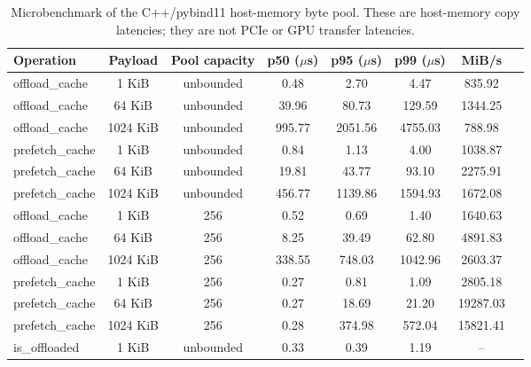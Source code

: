\begin{table}[t]
\centering
\scriptsize
\setlength{\tabcolsep}{2.5pt}
\caption{Microbenchmark of the C++/pybind11 host-memory byte pool. These are host-memory copy latencies; they are not PCIe or GPU transfer latencies.}
\label{tab:pool}
\begin{tabular}{lccccccc}
\toprule
Operation & Payload & Pool capacity & p50 ($\mu$s) & p95 ($\mu$s) & p99 ($\mu$s) & MiB/s \\
\midrule
offload\_cache & 1 KiB & unbounded & 0.48 & 2.70 & 4.47 & 835.92 \\
offload\_cache & 64 KiB & unbounded & 39.96 & 80.73 & 129.59 & 1344.25 \\
offload\_cache & 1024 KiB & unbounded & 995.77 & 2051.56 & 4755.03 & 788.98 \\
prefetch\_cache & 1 KiB & unbounded & 0.84 & 1.13 & 4.00 & 1038.87 \\
prefetch\_cache & 64 KiB & unbounded & 19.81 & 43.77 & 93.10 & 2275.91 \\
prefetch\_cache & 1024 KiB & unbounded & 456.77 & 1139.86 & 1594.93 & 1672.08 \\
offload\_cache & 1 KiB & 256 & 0.52 & 0.69 & 1.40 & 1640.63 \\
offload\_cache & 64 KiB & 256 & 8.25 & 39.49 & 62.80 & 4891.83 \\
offload\_cache & 1024 KiB & 256 & 338.55 & 748.03 & 1042.96 & 2603.37 \\
prefetch\_cache & 1 KiB & 256 & 0.27 & 0.81 & 1.09 & 2805.18 \\
prefetch\_cache & 64 KiB & 256 & 0.27 & 18.69 & 21.20 & 19287.03 \\
prefetch\_cache & 1024 KiB & 256 & 0.28 & 374.98 & 572.04 & 15821.41 \\
is\_offloaded & 1 KiB & unbounded & 0.33 & 0.39 & 1.19 & -- \\
\bottomrule
\end{tabular}
\end{table}
